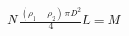\documentclass[preview]{standalone}
\begin{document}
\begin{align*}
N\,\tfrac{(\rho_1-\rho_2)\,\pi D^2}{4}L = M
\end{align*}
\end{document}
